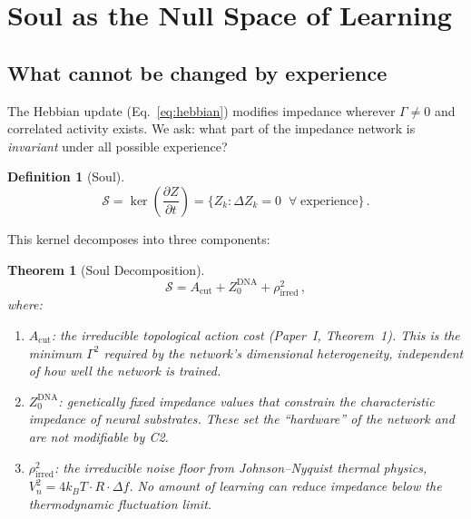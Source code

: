 \documentclass[aps,pre,twocolumn,superscriptaddress,floatfix]{revtex4-2}
\newtheorem{theorem}{Theorem}
\newtheorem{definition}{Definition}
\newcommand{\Acut}{A_{\text{cut}}}
\begin{document}
\section{Soul as the Null Space of Learning}
\label{sec:soul}

\subsection{What cannot be changed by experience}

The Hebbian update (Eq.~\ref{eq:hebbian}) modifies impedance
wherever $\Gamma\neq 0$ and correlated activity exists.
We ask: what part of the impedance network is \emph{invariant}
under all possible experience?

\begin{definition}[Soul]
\begin{equation}
  \mathcal{S} = \ker\!\left(\frac{\partial Z}{\partial t}\right)
  = \{Z_k : \Delta Z_k = 0\;\;\forall\;\text{experience}\}\,.
  \label{eq:soul}
\end{equation}
\end{definition}

This kernel decomposes into three components:

\begin{theorem}[Soul Decomposition]
\label{thm:soul-decomp}
\begin{equation}
  \mathcal{S} = \Acut + Z_0^{\text{DNA}} + \rho_{\text{irred}}^2\,,
  \label{eq:soul-decomposition}
\end{equation}
where:
\begin{enumerate}
  \item $\Acut$: the irreducible topological action cost
    (Paper~I, Theorem~1).  This is the minimum $\Gamma^2$
    required by the network's dimensional heterogeneity,
    independent of how well the network is trained.
  \item $Z_0^{\text{DNA}}$: genetically fixed impedance
    values that constrain the characteristic impedance of
    neural substrates.  These set the ``hardware'' of the
    network and are not modifiable by C2.
  \item $\rho_{\text{irred}}^2$: the irreducible noise floor
    from Johnson--Nyquist thermal physics,
    $V_n^2=4k_BT\cdot R\cdot\Delta f$.
    No amount of learning can reduce impedance below the
    thermodynamic fluctuation limit.
\end{enumerate}
\end{theorem}
\end{document}
